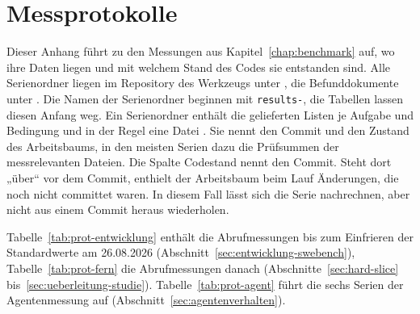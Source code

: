 \chapter{Messprotokolle}
\label{app:messprotokolle}

Dieser Anhang führt zu den Messungen aus Kapitel~\ref{chap:benchmark} auf, wo ihre Daten liegen und mit welchem Stand des Codes sie entstanden sind. Alle Serienordner liegen im Repository des Werkzeugs unter , die Befunddokumente unter . Die Namen der Serienordner beginnen mit \texttt{results-}, die Tabellen lassen diesen Anfang weg. Ein Serienordner enthält die gelieferten Listen je Aufgabe und Bedingung und in der Regel eine Datei . Sie nennt den Commit und den Zustand des Arbeitsbaums, in den meisten Serien dazu die Prüfsummen der messrelevanten Dateien. Die Spalte Codestand nennt den Commit. Steht dort „über“ vor dem Commit, enthielt der Arbeitsbaum beim Lauf Änderungen, die noch nicht committet waren. In diesem Fall lässt sich die Serie nachrechnen, aber nicht aus einem Commit heraus wiederholen.

Tabelle~\ref{tab:prot-entwicklung} enthält die Abrufmessungen bis zum Einfrieren der Standardwerte am 26.08.2026 (Abschnitt~\ref{sec:entwicklung-swebench}), Tabelle~\ref{tab:prot-fern} die Abrufmessungen danach (Abschnitte~\ref{sec:hard-slice} bis~\ref{sec:ueberleitung-studie}). Tabelle~\ref{tab:prot-agent} führt die sechs Serien der Agentenmessung auf (Abschnitt~\ref{sec:agentenverhalten}).

